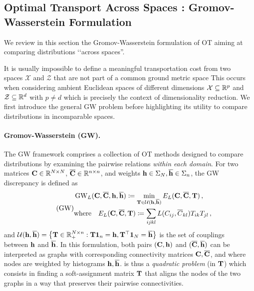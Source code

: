 \subsection{Optimal Transport Across Spaces : Gromov-Wasserstein Formulation}

We review in this section the Gromov-Wasserstein formulation of OT aiming at comparing distributions ‘‘across spaces''.

It is usually impossible to define a meaningful transportation cost from two spaces $\mathcal{X}$ and $\mathcal{Z}$ that are not part of a common ground metric space
This occurs when considering ambient Euclidean spaces of different dimensions \ie $\mathcal{X} \subseteq \mathbb{R}^p$ and $\mathcal{Z} \subseteq \mathbb{R}^d$ with $p \neq d$ which is precisely the context of dimensionality reduction.
We first introduce the general GW problem before highlighting its utility to compare distributions in incomparable spaces.

\paragraph{Gromov-Wasserstein (GW).} The GW framework \citep{memoli2011gromov,sturm2012space} comprises a collection of OT methods designed to compare distributions by examining the pairwise relations \emph{within each domain}. For two matrices ${\mathbf{C}} \in \mathbb{R}^{N \times N}$, $\overline{{\mathbf{C}}} \in \mathbb{R}^{n \times n}$, and weights ${\mathbf{h}} \in \Sigma_N, \overline{{\mathbf{h}}} \in \Sigma_n$, the GW discrepancy is defined as
\begin{equation}
\label{eq:gw_pb} 
\tag{GW}
\begin{split}
	&\operatorname{GW}_L ({\mathbf{C}}, \overline{{\mathbf{C}}}, {\mathbf{h}}, \overline{{\mathbf{h}}}) \coloneqq \min_{{\mathbf{T}} \in {\mathcal{U}}({\mathbf{h}}, \overline{{\mathbf{h}}})} E_L({\mathbf{C}}, \overline{{\mathbf{C}}}, {\mathbf{T}})\,, \\
	&\text{where} \quad E_L({\mathbf{C}}, \overline{{\mathbf{C}}}, {\mathbf{T}}) \coloneqq \sum_{ijkl}  L(C_{ij}, \overline{C}_{kl}) T_{ik} T_{jl}\,,
\end{split}
\end{equation}
and ${\mathcal{U}}({\mathbf{h}}, \overline{{\mathbf{h}}}) = \left\{ {\mathbf{T}} \in \mathbb{R}_+^{N \times n} : {\mathbf{T}} \bm{1}_n = {\mathbf{h}}, {\mathbf{T}}^\top \bm{1}_N = \overline{{\mathbf{h}}} \right\}$ is the set of couplings between ${\mathbf{h}}$ and $\overline{{\mathbf{h}}}$.
In this formulation, both pairs $({\mathbf{C}}, {\mathbf{h}})$ and $(\overline{{\mathbf{C}}}, \overline{{\mathbf{h}}})$ can be interpreted as graphs with corresponding connectivity matrices ${\mathbf{C}}, \overline {{\mathbf{C}}}$, and where nodes are weighted by histograms ${\mathbf{h}}, \overline {{\mathbf{h}}}$.  is thus a \emph{quadratic problem} (in ${\mathbf{T}}$) which consists in finding a soft-assignment matrix ${\mathbf{T}}$ that aligns the nodes of the two graphs in a way that preserves their pairwise connectivities. 

